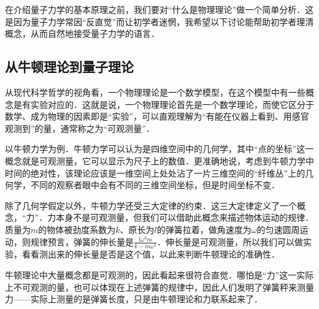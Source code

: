 
在介绍量子力学的基本原理之前，我们要对“什么是物理理论”做一个简单分析．这是因为量子力学常因“反直觉”而让初学者迷惘，我希望以下讨论能帮助初学者理清概念，从而自然地接受量子力学的语言．

\subsection{从牛顿理论到量子理论}

从现代科学哲学的视角看，一个物理理论是一个数学模型，在这个模型中有一些概念是有实验对应的．这就是说，一个物理理论首先是一个数学理论，而使它区分于数学、成为物理的因素即是“实验”，可以直观理解为“有能在仪器上看到、用感官观测到”的量，通常称之为“可观测量”．

以牛顿力学为例．牛顿力学可以认为是四维空间中的几何学，其中“点的坐标”这一概念就是可观测量，它可以显示为尺子上的数值．更准确地说，考虑到牛顿力学中时间的绝对性，该理论应该是一维空间上处处沾了一片三维空间的“纤维丛”上的几何学，不同的观察者眼中会有不同的三维空间坐标，但是时间坐标不变．

除了几何学假定以外，牛顿力学还受三大定律的约束．这三大定律定义了一个概念，“力”．力本身不是可观测量，但我们可以借助此概念来描述物体运动的规律．质量为$m$的物体被劲度系数为$k$、原长为$l$的弹簧拉着，做角速度为$\omega$的匀速圆周运动，则规律预言，弹簧的伸长量是$\frac{l\omega^2m}{k-m\omega^2}$．伸长量是可观测量，所以我们可以做实验，看看测出来的伸长量是否是这个值，以此来判断牛顿理论的准确性．

牛顿理论中大量概念都是可观测的，因此看起来很符合直觉．哪怕是“力”这一实际上不可观测的量，也可以体现在上述弹簧的规律中，因此人们发明了弹簧秤来测量力——实际上测量的是弹簧长度，只是由牛顿理论和力联系起来了．




























